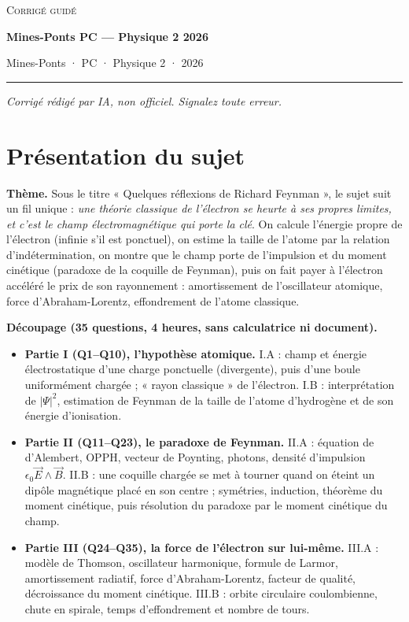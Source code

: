 \documentclass[11pt,a4paper]{article}
\providecommand{\tightlist}{\setlength{\itemsep}{0pt}\setlength{\parskip}{0pt}}
\begin{document}
\thispagestyle{plain}
\begin{center}
  {\small\scshape Corrigé guidé}\par\smallskip
  {\LARGE\bfseries Mines-Ponts PC — Physique 2 2026\par}\medskip
  {\large Mines-Ponts · PC · Physique 2 · 2026\par}
\end{center}
\vspace{2pt}\hrule\vspace{8pt}

\emph{Corrigé rédigé par IA, non officiel. Signalez toute erreur.}

\hypertarget{pruxe9sentation-du-sujet}{%
\section{Présentation du sujet}\label{pruxe9sentation-du-sujet}}

\textbf{Thème.} Sous le titre « Quelques réflexions de Richard Feynman », le sujet suit un fil unique : \emph{une théorie classique de l'électron se heurte à ses propres limites, et c'est le champ électromagnétique qui porte la clé}. On calcule l'énergie propre de l'électron (infinie s'il est ponctuel), on estime la taille de l'atome par la relation d'indétermination, on montre que le champ porte de l'impulsion et du moment cinétique (paradoxe de la coquille de Feynman), puis on fait payer à l'électron accéléré le prix de son rayonnement : amortissement de l'oscillateur atomique, force d'Abraham-Lorentz, effondrement de l'atome classique.

\textbf{Découpage (35 questions, 4 heures, sans calculatrice ni document).}

\begin{itemize}
\tightlist
\item
  \textbf{Partie I (Q1--Q10), l'hypothèse atomique.} I.A : champ et énergie électrostatique d'une charge ponctuelle (divergente), puis d'une boule uniformément chargée ; « rayon classique » de l'électron. I.B : interprétation de \(|\Psi|^2\), estimation de Feynman de la taille de l'atome d'hydrogène et de son énergie d'ionisation.
\item
  \textbf{Partie II (Q11--Q23), le paradoxe de Feynman.} II.A : équation de d'Alembert, OPPH, vecteur de Poynting, photons, densité d'impulsion \(\epsilon_0\vec E\wedge\vec B\). II.B : une coquille chargée se met à tourner quand on éteint un dipôle magnétique placé en son centre ; symétries, induction, théorème du moment cinétique, puis résolution du paradoxe par le moment cinétique du champ.
\item
  \textbf{Partie III (Q24--Q35), la force de l'électron sur lui-même.} III.A : modèle de Thomson, oscillateur harmonique, formule de Larmor, amortissement radiatif, force d'Abraham-Lorentz, facteur de qualité, décroissance du moment cinétique. III.B : orbite circulaire coulombienne, chute en spirale, temps d'effondrement et nombre de tours.
\end{itemize}
\end{document}
